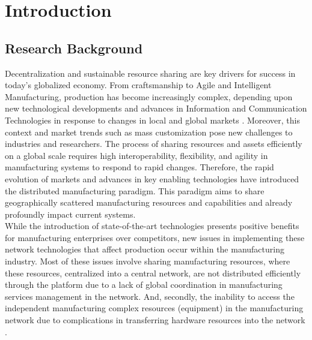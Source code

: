 \chapter{Introduction}

\section{Research Background}
Decentralization and sustainable resource sharing are key drivers for success in today’s globalized economy. From craftsmanship to Agile and Intelligent Manufacturing, production has become increasingly complex, depending upon new technological developments and advances in Information and Communication Technologies in response to changes in local and global markets \parencite{model_information_2012}. Moreover, this context and market trends such as mass customization pose new challenges to industries and researchers. The process of sharing resources and assets efficiently on a global scale requires high interoperability, flexibility, and agility in manufacturing systems to respond to rapid changes. Therefore, the rapid evolution of markets and advances in key enabling technologies have introduced the distributed manufacturing paradigm. This paradigm aims to share geographically scattered manufacturing resources and capabilities and already profoundly impact current systems.\\
While the introduction of state-of-the-art technologies presents positive benefits for manufacturing enterprises over competitors, new issues in implementing these network technologies that affect production occur within the manufacturing industry. Most of these issues involve sharing manufacturing resources, where these resources, centralized into a central network, are not distributed efficiently through the platform due to a lack of global coordination in manufacturing services management in the network. And, secondly, the inability to access the independent manufacturing complex resources (equipment) in the manufacturing network due to complications in transferring hardware resources into the network \parencite{laili_study_2012}\parencite{xu_cloud_2012}.\\
